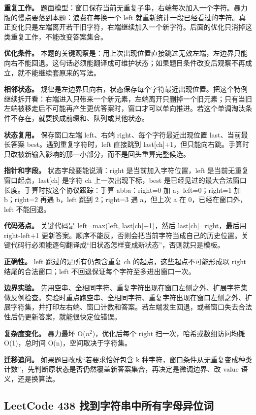 \textbf{重复工作。} 题面模型：窗口保存当前无重复子串，右端每次加入一个字符。暴力版的慢点要落到本题：浪费在每换一个 left 就重新统计一段已经看过的字符。真正变化只是左端离开若干旧字符，右端继续加入一个新字符。后面的优化只消掉这类重复工作，不能改变答案集合。

\textbf{优化条件。} 本题的关键观察是：用上次出现位置直接跳过无效左端，左边界只能向右不能回退。这句话必须能翻译成可维护状态；如果题目条件改变后观察不再成立，就不能继续套原来的写法。

\textbf{相邻状态。} 规律是左边界只向右，状态保存每个字符最近出现位置。把这个特例继续拆开看：右端进入只带来一个新元素，左端离开只删掉一个旧元素；只有当旧左端被移走后不可能再产生更优答案时，窗口才可以单向推进。若这个单调淘汰条件不存在，就要换成前缀和、队列或其他状态。

\textbf{状态复用。} 保存窗口左端 left、右端 right、每个字符最近出现位置 last、当前最长答案 best。遇到重复字符时，left 直接跳到 last[ch]+1，但只能向右跳。手算时只改被新输入影响的那一小部分，而不是回头重算完整候选。

\textbf{指针和字段。} 状态字段要能说清：right 是当前加入字符位置，left 是当前无重复窗口起点，last[ch] 是字符 ch 上一次出现下标，best 是已经见过的最大合法窗口长度。手算时按这个协议跟踪：手算 abba：right=0 加 a，left=0；right=1 加 b；right=2 再遇 b，left 跳到 2；right=3 遇 a，但上次 a 在 0，已经在窗口外，left 不能回退。

\textbf{代码落点。} 关键代码是 left=max(left, last[ch]+1)，然后 last[ch]=right，最后用 right-left+1 更新答案。顺序不能反，否则会把当前字符当成自己的历史位置。关键代码行必须能逐句翻译成“旧状态怎样变成新状态”，否则就只是模板。

\textbf{正确性。} left 跳过的是所有仍包含重复 ch 的起点，这些起点不可能形成以 right 结尾的合法窗口；left 不回退保证每个字符至多进出窗口一次。

\textbf{边界实验。} 先用空串、全相同字符、重复字符出现在窗口左侧之外、扩展字符集做反例检查。实验时重点跑空串、全相同字符、重复字符出现在窗口左侧之外、扩展字符集，并打印左右端、窗口计数和答案。若左端发生回退，或者窗口失去合法性后仍更新答案，就能很快定位错误。

\textbf{复杂度变化。} 暴力最坏 O(\ensuremath{n^{2}})，优化后每个 right 扫一次，哈希或数组访问均摊 O(1)，总时间 O(n)，空间取决于字符集。

\textbf{迁移追问。} 如果题目改成“若要求恰好包含 k 种字符，窗口条件从无重复变成种类计数”，先判断原状态是否仍然覆盖新答案集合，再决定是微调边界、改 value 语义，还是换算法。

\subsection{LeetCode 438 找到字符串中所有字母异位词}

